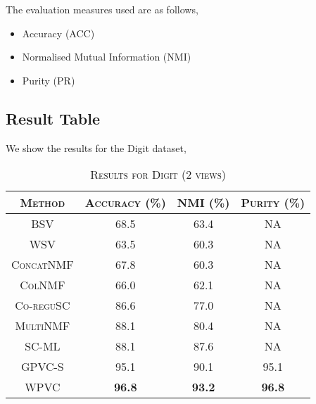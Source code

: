 \documentclass[a4paper]{article}
\begin{document}
	The evaluation measures used are as follows,
	\begin{itemize}
	\item {Accuracy (ACC)}
	\item {Normalised Mutual Information (NMI)}
	\item {Purity (PR)}
	\end{itemize}
	

	\subsection{Result Table}	

	We show the results for the Digit dataset,	
	\begin{table}[h!]
	  \begin{center}
	    \begin{tabular}{c|c|c|c}
	      \toprule
	      \textsc{Method} & \textsc{Accuracy (\%) } & \textsc{NMI (\%) } 
	      & \textsc{Purity (\%)} 	\\
            
		  \midrule
			\textsc{BSV} & 68.5 & 63.4 & NA\\
			\textsc{WSV} & 63.5 & 60.3 & NA\\
			\textsc{ConcatNMF} & 67.8 & 60.3 & NA\\
			\textsc{ColNMF} & 66.0 & 62.1 & NA\\
			\textsc{Co-reguSC} & 86.6 & 77.0 & NA\\
			\textsc{MultiNMF} & 88.1 & 80.4 & NA\\
			\textsc{SC-ML} & 88.1 & 87.6 & NA\\
			\textsc{GPVC-S} & 95.1 & 90.1 & 95.1\\  
			\textsc{WPVC} & \textbf{96.8} & \textbf{93.2} & \textbf{96.8}\\
		  
		  \bottomrule
	    \end{tabular}
	    \caption*{\textsc{Results for Digit (2 views)}}
	  \end{center}
	\end{table}		
\end{document}
